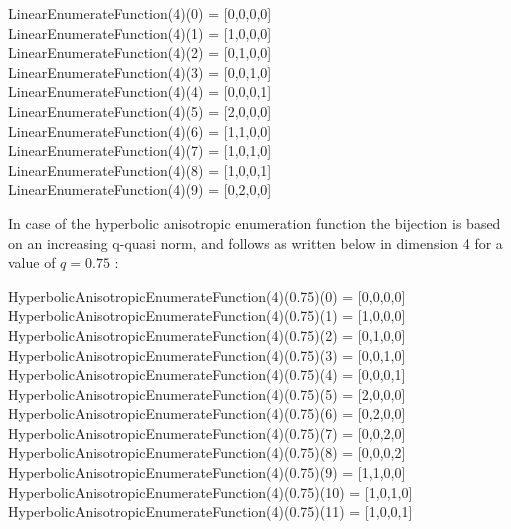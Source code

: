\begin{center}

  LinearEnumerateFunction(4)(0) = [0,0,0,0] \\
  LinearEnumerateFunction(4)(1) = [1,0,0,0] \\
  LinearEnumerateFunction(4)(2) = [0,1,0,0] \\
  LinearEnumerateFunction(4)(3) = [0,0,1,0] \\
  LinearEnumerateFunction(4)(4) = [0,0,0,1] \\
  LinearEnumerateFunction(4)(5) = [2,0,0,0] \\
  LinearEnumerateFunction(4)(6) = [1,1,0,0] \\
  LinearEnumerateFunction(4)(7) = [1,0,1,0] \\
  LinearEnumerateFunction(4)(8) = [1,0,0,1] \\
  LinearEnumerateFunction(4)(9) = [0,2,0,0]

\end{center}

In case of the hyperbolic anisotropic enumeration function the bijection is based on an increasing q-quasi norm, and follows as written below in dimension 4 for a value of $q=0.75$ :
\begin{center}
  HyperbolicAnisotropicEnumerateFunction(4)(0.75)(0) = [0,0,0,0] \\
  HyperbolicAnisotropicEnumerateFunction(4)(0.75)(1) = [1,0,0,0] \\
  HyperbolicAnisotropicEnumerateFunction(4)(0.75)(2) = [0,1,0,0] \\
  HyperbolicAnisotropicEnumerateFunction(4)(0.75)(3) = [0,0,1,0] \\
  HyperbolicAnisotropicEnumerateFunction(4)(0.75)(4) = [0,0,0,1] \\
  HyperbolicAnisotropicEnumerateFunction(4)(0.75)(5) = [2,0,0,0] \\
  HyperbolicAnisotropicEnumerateFunction(4)(0.75)(6) = [0,2,0,0] \\
  HyperbolicAnisotropicEnumerateFunction(4)(0.75)(7) = [0,0,2,0] \\
  HyperbolicAnisotropicEnumerateFunction(4)(0.75)(8) = [0,0,0,2] \\
  HyperbolicAnisotropicEnumerateFunction(4)(0.75)(9) = [1,1,0,0] \\
  HyperbolicAnisotropicEnumerateFunction(4)(0.75)(10) = [1,0,1,0] \\
  HyperbolicAnisotropicEnumerateFunction(4)(0.75)(11) = [1,0,0,1] \\
\end{center}

